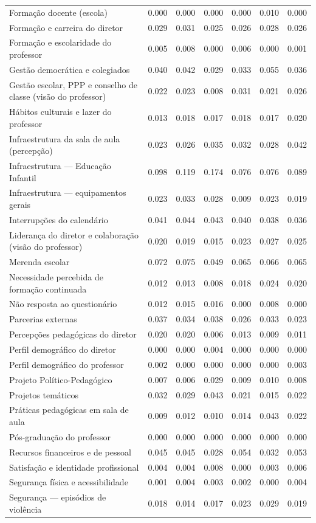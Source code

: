 \begin{tabular}{lrrrrrr}
Formação docente (escola) & 0.000 & 0.000 & 0.000 & 0.000 & 0.010 & 0.000 \\
Formação e carreira do diretor & 0.029 & 0.031 & 0.025 & 0.026 & 0.028 & 0.026 \\
Formação e escolaridade do professor & 0.005 & 0.008 & 0.000 & 0.006 & 0.000 & 0.001 \\
Gestão democrática e colegiados & 0.040 & 0.042 & 0.029 & 0.033 & 0.055 & 0.036 \\
Gestão escolar, PPP e conselho de classe (visão do professor) & 0.022 & 0.023 & 0.008 & 0.031 & 0.021 & 0.026 \\
Hábitos culturais e lazer do professor & 0.013 & 0.018 & 0.017 & 0.018 & 0.017 & 0.020 \\
Infraestrutura da sala de aula (percepção) & 0.023 & 0.026 & 0.035 & 0.032 & 0.028 & 0.042 \\
Infraestrutura — Educação Infantil & 0.098 & 0.119 & 0.174 & 0.076 & 0.076 & 0.089 \\
Infraestrutura — equipamentos gerais & 0.023 & 0.033 & 0.028 & 0.009 & 0.023 & 0.019 \\
Interrupções do calendário & 0.041 & 0.044 & 0.043 & 0.040 & 0.038 & 0.036 \\
Liderança do diretor e colaboração (visão do professor) & 0.020 & 0.019 & 0.015 & 0.023 & 0.027 & 0.025 \\
Merenda escolar & 0.072 & 0.075 & 0.049 & 0.065 & 0.066 & 0.065 \\
Necessidade percebida de formação continuada & 0.012 & 0.013 & 0.008 & 0.018 & 0.024 & 0.020 \\
Não resposta ao questionário & 0.012 & 0.015 & 0.016 & 0.000 & 0.008 & 0.000 \\
Parcerias externas & 0.037 & 0.034 & 0.038 & 0.026 & 0.033 & 0.023 \\
Percepções pedagógicas do diretor & 0.020 & 0.020 & 0.006 & 0.013 & 0.009 & 0.011 \\
Perfil demográfico do diretor & 0.000 & 0.000 & 0.004 & 0.000 & 0.000 & 0.000 \\
Perfil demográfico do professor & 0.002 & 0.000 & 0.000 & 0.000 & 0.000 & 0.003 \\
Projeto Político-Pedagógico & 0.007 & 0.006 & 0.029 & 0.009 & 0.010 & 0.008 \\
Projetos temáticos & 0.032 & 0.029 & 0.043 & 0.021 & 0.015 & 0.022 \\
Práticas pedagógicas em sala de aula & 0.009 & 0.012 & 0.010 & 0.014 & 0.043 & 0.022 \\
Pós-graduação do professor & 0.000 & 0.000 & 0.000 & 0.000 & 0.000 & 0.000 \\
Recursos financeiros e de pessoal & 0.045 & 0.045 & 0.028 & 0.054 & 0.032 & 0.053 \\
Satisfação e identidade profissional & 0.004 & 0.004 & 0.008 & 0.000 & 0.003 & 0.006 \\
Segurança física e acessibilidade & 0.001 & 0.004 & 0.003 & 0.002 & 0.000 & 0.004 \\
Segurança — episódios de violência & 0.018 & 0.014 & 0.017 & 0.023 & 0.029 & 0.019 \\
\bottomrule
\end{tabular}
